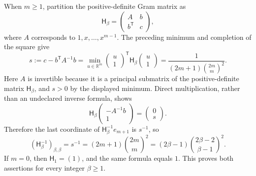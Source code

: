 When \(m\ge1\), partition the positive-definite Gram matrix as
\[
\mathsf H_\beta=
\begin{pmatrix}
A&b\\
b^{\mathsf T}&c
\end{pmatrix},
\]
where \(A\) corresponds to \(1,x,\ldots,x^{m-1}\).  The preceding minimum and completion of the square give
\[
s:=c-b^{\mathsf T}A^{-1}b
=\min_{u\in\mathbb R^m}
\begin{pmatrix}u\\1\end{pmatrix}^{\!\mathsf T}
\mathsf H_\beta
\begin{pmatrix}u\\1\end{pmatrix}
=\frac{1}{(2m+1)\binom{2m}{m}^{2}}.
\]
Here \(A\) is invertible because it is a principal submatrix of the positive-definite matrix \(\mathsf H_\beta\), and \(s>0\) by the displayed minimum.  Direct multiplication, rather than an undeclared inverse formula, shows
\[
\mathsf H_\beta
\begin{pmatrix}-A^{-1}b\\1\end{pmatrix}
=
\begin{pmatrix}0\\s\end{pmatrix}.
\]
Therefore the last coordinate of \(\mathsf H_\beta^{-1}e_{m+1}\) is \(s^{-1}\), so
\[
(\mathsf H_\beta^{-1})_{\beta,\beta}
=s^{-1}
=(2m+1)\binom{2m}{m}^{2}
=(2\beta-1)\binom{2\beta-2}{\beta-1}^{\!2}.
\]
If \(m=0\), then \(\mathsf H_1=(1)\), and the same formula equals \(1\).  This proves both assertions for every integer \(\beta\ge1\).